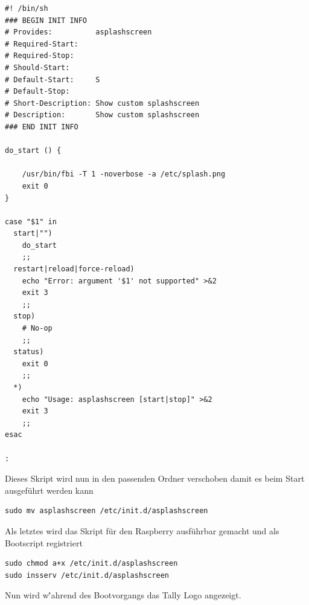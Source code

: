 \documentclass[11pt,a4paper]{article} %
\begin{document}
\begin{frame}

\begin{lstlisting}
#! /bin/sh
### BEGIN INIT INFO
# Provides:          asplashscreen
# Required-Start:
# Required-Stop:
# Should-Start:      
# Default-Start:     S
# Default-Stop:
# Short-Description: Show custom splashscreen
# Description:       Show custom splashscreen
### END INIT INFO
 
do_start () {
 
    /usr/bin/fbi -T 1 -noverbose -a /etc/splash.png    
    exit 0
}
 
case "$1" in
  start|"")
    do_start
    ;;
  restart|reload|force-reload)
    echo "Error: argument '$1' not supported" >&2
    exit 3
    ;;
  stop)
    # No-op
    ;;
  status)
    exit 0
    ;;
  *)
    echo "Usage: asplashscreen [start|stop]" >&2
    exit 3
    ;;
esac
 
:
\end{lstlisting}

\end{frame}

Dieses Skript wird nun in den passenden Ordner verschoben damit es beim Start ausgeführt werden kann
\begin{frame}

\begin{lstlisting}
sudo mv asplashscreen /etc/init.d/asplashscreen
\end{lstlisting}
\end{frame}

Als letztes wird das Skript für den Raspberry ausführbar gemacht und als Bootscript registriert
\begin{frame}

\begin{lstlisting}
sudo chmod a+x /etc/init.d/asplashscreen
sudo insserv /etc/init.d/asplashscreen
\end{lstlisting}
\end{frame}

Nun wird w\''ahrend des Bootvorgangs das Tally Logo angezeigt.
\end{document}
